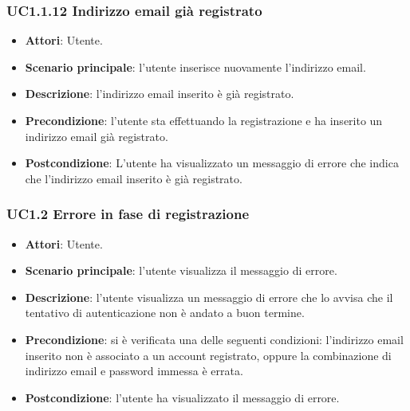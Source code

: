 \subsubsection{UC1.1.12 Indirizzo email già registrato}
\begin{itemize}
\item \textbf{Attori}: Utente.
\item \textbf{Scenario principale}: l'utente inserisce nuovamente l'indirizzo email.
\item \textbf{Descrizione}: l'indirizzo email inserito è già registrato.
\item \textbf{Precondizione}: l'utente sta effettuando la registrazione e ha inserito un indirizzo email già registrato.
\item \textbf{Postcondizione}: L'utente ha visualizzato un messaggio di errore che indica che l'indirizzo email inserito è già registrato.
\end{itemize}
\subsubsection{UC1.2 Errore in fase di registrazione}
\begin{itemize}
\item \textbf{Attori}: Utente.
\item \textbf{Scenario principale}: l'utente visualizza il messaggio di errore.
\item \textbf{Descrizione}: l'utente visualizza un messaggio di errore che lo avvisa che il tentativo di autenticazione non è andato a buon termine.
\item \textbf{Precondizione}: si è verificata una delle seguenti condizioni: l'indirizzo email inserito non è associato a un account registrato, oppure la combinazione di indirizzo email e password immessa è errata.
\item \textbf{Postcondizione}: l'utente ha visualizzato il messaggio di errore.
\end{itemize}
